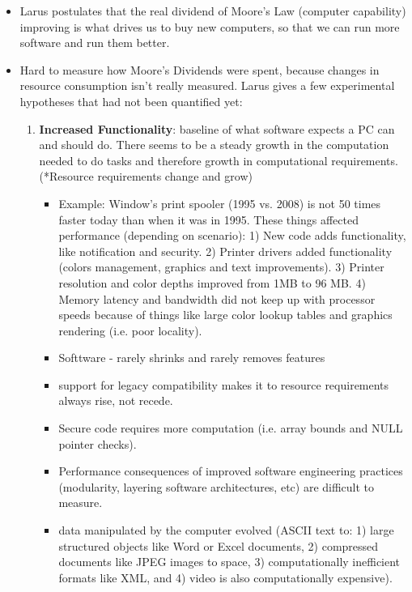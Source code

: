 \documentclass [12pt]{article}
\begin{document}
\begin{itemize}
            \item Larus postulates that the real dividend of Moore's Law (computer capability) improving is what drives us to buy new computers, so that we can run more software and run them better. 
            \item Hard to measure how Moore's Dividends were spent, because changes in resource consumption isn't really measured. Larus gives a few experimental hypotheses that had not been quantified yet: 
                \begin{enumerate}
                    \item \textbf{Increased Functionality}: baseline of what software expects a PC can and should do. There seems to be a steady growth in the computation needed to do tasks and therefore growth in computational requirements. (*Resource requirements change and grow)
                        \begin{itemize}
                            \item Example: Window's print spooler (1995 vs. 2008) is not 50 times faster today than when it was in 1995. These things affected performance (depending on scenario): 1) New code adds functionality, like notification and security. 2) Printer drivers added functionality (colors management, graphics and text improvements). 3) Printer resolution and color depths improved from 1MB to 96 MB. 4) Memory latency and bandwidth did not keep up with processor speeds because of things like large color lookup tables and graphics rendering (i.e. poor locality).
                            \item Softtware - rarely shrinks and rarely removes features 
                            \item support for legacy compatibility makes it to resource requirements always rise, not recede. 
                            \item Secure code requires more computation (i.e. array bounds and NULL pointer checks).
                            \item Performance consequences of improved software engineering practices (modularity, layering software architectures, etc) are difficult to measure.
                            \item data manipulated by the computer evolved (ASCII text to: 1) large structured objects like Word or Excel documents, 2) compressed documents like JPEG images to space, 3) computationally inefficient formats like XML, and 4) video is also computationally expensive). 

\end{itemize}
\end{enumerate}
\end{itemize}
\end{document}
